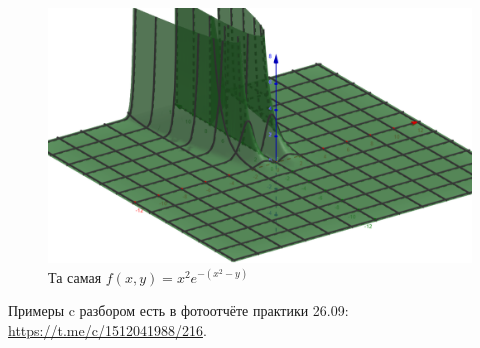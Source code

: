 \documentclass[12pt, a4paper]{article}
\begin{document}
\begin{figure}[h!]
  \centering
  \includegraphics[width=\textwidth]{res/weird_func_no_lim.png}
  \caption{Та самая $f(x,y)=x^2 e^{-(x^2-y)}$}
  \label{fig:no_lim}
\end{figure}
\FloatBarrier 


Примеры c разбором есть в фотоотчёте практики 26.09: \url{https://t.me/c/1512041988/216}. 
\end{document}
